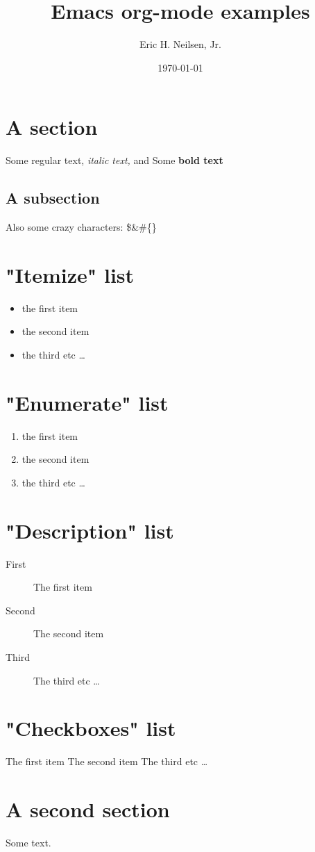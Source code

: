 \documentclass{article}%
\title{Emacs org{-}mode examples}%
\author{Eric H. Neilsen, Jr.}%
\date{\today}%
\begin{document}
%
\normalsize%
\maketitle%
\section{A section}%
\label{sec:A section}%
Some regular text, %
\textit{italic text, }%
and Some %
\textbf{bold text}%
\subsection{A subsection}%
\label{subsec:A subsection}%
Also some crazy characters: \$\&\#\{\}

%
\section{"Itemize" list}%
\label{sec:Itemize list}%
\begin{itemize}%
\item%
the first item%
\item%
the second item%
\item%
the third etc%
\ldots%
\end{itemize}

%
\section{"Enumerate" list}%
\label{sec:Enumerate list}%
\begin{enumerate}[label=\alph*),start=20]%
\item%
the first item%
\item%
the second item%
\item%
the third etc \ldots%
\end{enumerate}

%
\section{"Description" list}%
\label{sec:Description list}%
\begin{description}%
\item[First]%
The first item%
\item[Second]%
The second item%
\item[Third]%
The third etc \ldots%
\end{description}

%
\section{"Checkboxes" list}%
\label{sec:Checkboxes list}%
\begin{checkboxes}%
\choice%
The first item%
\CorrectChoice%
The second item%
\choice%
The third etc \ldots%
\end{checkboxes}

%
\section{A second section}%
\label{sec:A second section}%
Some text.

%
\end{document}
